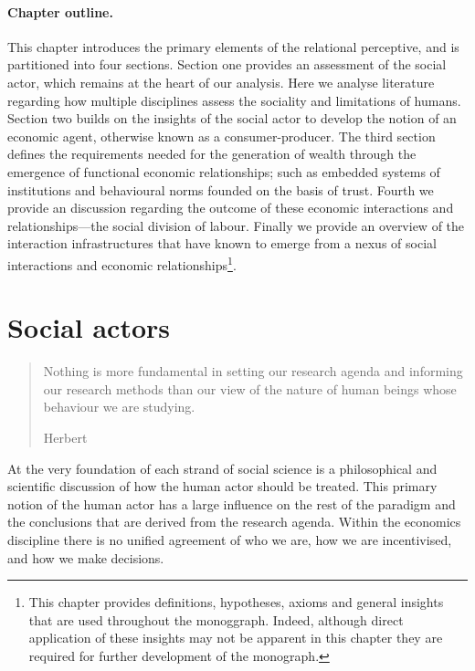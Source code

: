 \paragraph{Chapter outline.}

This chapter introduces the primary elements of the relational perceptive, and is partitioned into four sections. Section one provides an assessment of the social actor, which remains at the heart of our analysis. Here we analyse literature regarding how multiple disciplines assess the sociality and limitations of humans. Section two builds on the insights of the social actor to develop the notion of an economic agent, otherwise known as a consumer-producer. The third section defines the requirements needed for the generation of wealth through the emergence of functional economic relationships; such as embedded systems of institutions and behavioural norms founded on the basis of trust. Fourth we provide an discussion regarding the outcome of these economic interactions and relationships---the social division of labour. Finally we provide an overview of the interaction infrastructures that have known to emerge from a nexus of social interactions and economic relationships\footnote{This chapter provides definitions, hypotheses, axioms and general insights that are used throughout the monoggraph. Indeed, although direct application of these insights may not be apparent in this chapter they are required for further development of the monograph.}.

\section{Social actors}

\begin{quote}
Nothing is more fundamental in setting our research agenda and informing our research methods than our view of the nature of human beings whose behaviour we are studying.

\begin{flushright}
Herbert \citet[p.~303]{Simon1985}
\end{flushright}
\end{quote}

At the very foundation of each strand of social science is a philosophical and scientific discussion of how the human actor should be treated. This primary notion of the human actor has a large influence on the rest of the paradigm and the conclusions that are derived from the research agenda. Within the economics discipline there is no unified agreement of who we are, how we are incentivised, and how we make decisions. 

